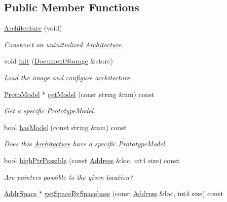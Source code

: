 \subsection*{Public Member Functions}
\begin{DoxyCompactItemize}
\item 
\mbox{\hyperlink{class_architecture_aea7049f03a24618ef02d876b0659f67d}{Architecture}} (void)
\begin{DoxyCompactList}\small\item\em Construct an uninitialized \mbox{\hyperlink{class_architecture}{Architecture}}. \end{DoxyCompactList}\item 
void \mbox{\hyperlink{class_architecture_abcf0d020ebe4248b9b35f3a51b78363b}{init}} (\mbox{\hyperlink{class_document_storage}{Document\+Storage}} \&store)
\begin{DoxyCompactList}\small\item\em Load the image and configure architecture. \end{DoxyCompactList}\item 
\mbox{\hyperlink{class_proto_model}{Proto\+Model}} $\ast$ \mbox{\hyperlink{class_architecture_a03485a52fdf3b18f004ff4687d159a1e}{get\+Model}} (const string \&nm) const
\begin{DoxyCompactList}\small\item\em Get a specific Prototype\+Model. \end{DoxyCompactList}\item 
bool \mbox{\hyperlink{class_architecture_a0075f8ca742086c8be493703b3f2f3cd}{has\+Model}} (const string \&nm) const
\begin{DoxyCompactList}\small\item\em Does this \mbox{\hyperlink{class_architecture}{Architecture}} have a specific Prototype\+Model. \end{DoxyCompactList}\item 
bool \mbox{\hyperlink{class_architecture_a9ec2e6c18d4b1280dc955ec0ace7d476}{high\+Ptr\+Possible}} (const \mbox{\hyperlink{class_address}{Address}} \&loc, int4 size) const
\begin{DoxyCompactList}\small\item\em Are pointers possible to the given location? \end{DoxyCompactList}\item 
\mbox{\hyperlink{class_addr_space}{Addr\+Space}} $\ast$ \mbox{\hyperlink{class_architecture_a6cef69bf3d546ca1012fcf5c017f7f3a}{get\+Space\+By\+Spacebase}} (const \mbox{\hyperlink{class_address}{Address}} \&loc, int4 size) const

\end{DoxyCompactItemize}
